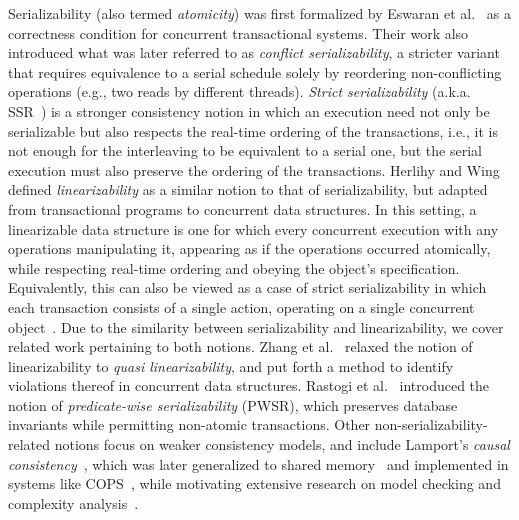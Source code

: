 Serializability (also termed 
\textit{atomicity}) was first formalized by Eswaran et al.~\cite{EsGrKoTr76} as 
a 
correctness condition for concurrent transactional systems. 
Their work also introduced what was later referred to as \textit{conflict 
serializability}, a stricter variant that requires equivalence to a serial 
schedule solely by reordering non-conflicting operations (e.g., two reads by 
different threads). 
%
\textit{Strict serializability} (a.k.a. SSR~\cite{Pa79}) is a stronger 
consistency 
notion in which an execution need not only be serializable but also respects 
the real-time ordering of the transactions, i.e., it is not enough for the 
interleaving to be equivalent to a serial one, but the serial execution must 
also preserve the ordering of the transactions.
%
%
%
%
Herlihy and Wing~\cite{HeWe87, HeWi90} defined \textit{linearizability} as a 
similar notion to that of serializability, but adapted from transactional 
programs 
to concurrent data structures. In this setting, a linearizable data structure 
is one for which every concurrent execution 
with any operations manipulating it, appearing as if the operations occurred 
atomically, while respecting real-time ordering and obeying the object's 
specification. 
%
Equivalently, this can also be viewed as a case of strict serializability in 
which each transaction consists of a single action, operating on a single 
concurrent object~\cite{WaSt06a}.
%
Due to the similarity between serializability and linearizability, we cover 
related work pertaining to both notions.
%
Zhang et al.~\cite{ZhChWa13} relaxed the notion of linearizability to 
\textit{quasi 
linearizability}, and put forth a method to identify violations thereof in 
concurrent data structures.
%
Rastogi et al.~\cite{RaMeBrKoSi93} introduced the notion of 
\textit{predicate-wise serializability} (PWSR), which preserves database 
invariants 
while permitting non-atomic transactions.
%
Other non-serializability-related notions focus on weaker consistency models, 
and include Lamport’s \textit{causal 
consistency}~\cite{La78}, which was later generalized to shared 
memory~\cite{AhNeBuKoHu95} 
and implemented in systems like 
COPS~\cite{LlFrKaAn11}, while motivating extensive research on model checking and 
complexity analysis~\cite{BoEnGuHa17,ZeBiBoEnEr19,LaBo20}. 


